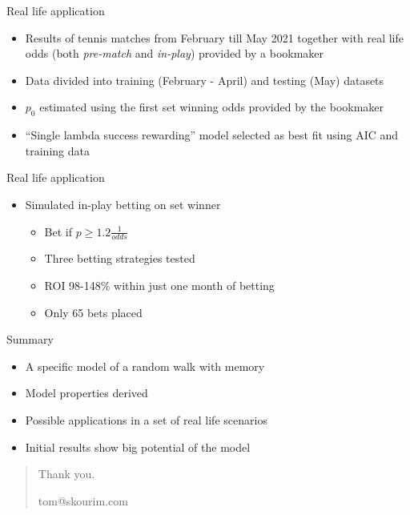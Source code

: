 \documentclass[american]{beamer}
\begin{document}
    \begin{frame}{Real life application}
        \begin{itemize}
            \item Results of tennis matches from February till May 2021 together with real life odds (both \emph{pre-match} and \emph{in-play}) provided by a bookmaker
	        \item Data divided into training (February - April) and testing (May) datasets
            \item $p_{0}$ estimated using the first set winning odds provided by the bookmaker
            \item ``Single lambda success rewarding'' model selected as best fit using AIC and training data
        \end{itemize}
    \end{frame}

    \begin{frame}{Real life application}
        \begin{itemize}
            \item Simulated in-play betting on set winner
            \begin{itemize}
                \item<2-> Bet if $p\geq {1.2}\frac{1}{odds}$
                \item<3-> Three betting strategies tested
                \item<4-> ROI 98-148\% within just one month of betting
                \item<5-> Only 65 bets placed
            \end{itemize}
        \end{itemize}
    \end{frame}

    \begin{frame}{Summary}
        \begin{itemize}
            \item A specific model of a random walk with memory
            \item Model properties derived
            \item Possible applications in a set of real life scenarios
            \item Initial results show big potential of the model
        \end{itemize}
    \end{frame}

    \begin{frame}[plain]
        \begin{quote}
            \begin{center}
                \huge{Thank you.}
            \end{center}
            \vspace{10mm}
            \begin{center}
                \large{tom@skourim.com}
            \end{center}
        \end{quote}
    \end{frame}
\end{document}
